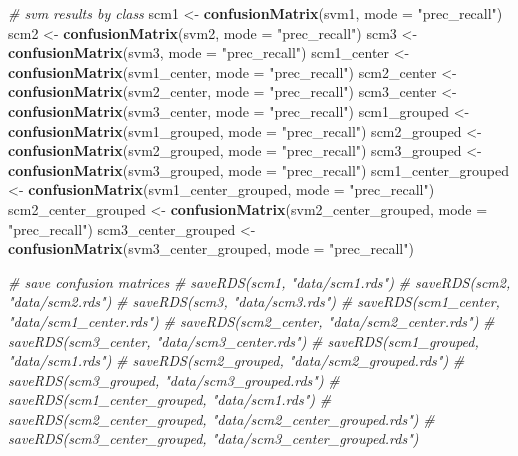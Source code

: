 \documentclass[12pt,twoside]{reedthesis}
\newenvironment{Shaded}{\begin{snugshade}}{\end{snugshade}}
\newcommand{\CommentTok}[1]{\textcolor[rgb]{0.56,0.35,0.01}{\textit{#1}}}
\newcommand{\DataTypeTok}[1]{\textcolor[rgb]{0.13,0.29,0.53}{#1}}
\newcommand{\KeywordTok}[1]{\textcolor[rgb]{0.13,0.29,0.53}{\textbf{#1}}}
\newcommand{\NormalTok}[1]{#1}
\newcommand{\StringTok}[1]{\textcolor[rgb]{0.31,0.60,0.02}{#1}}
\begin{document}
\begin{Shaded}
\begin{Highlighting}[]
{{{\CommentTok{# svm results by class}
\NormalTok{scm1 <-}\StringTok{ }\KeywordTok{confusionMatrix}\NormalTok{(svm1,  }\DataTypeTok{mode =} \StringTok{"prec_recall"}\NormalTok{)}
\NormalTok{scm2 <-}\StringTok{ }\KeywordTok{confusionMatrix}\NormalTok{(svm2,  }\DataTypeTok{mode =} \StringTok{"prec_recall"}\NormalTok{)}
\NormalTok{scm3 <-}\StringTok{ }\KeywordTok{confusionMatrix}\NormalTok{(svm3,  }\DataTypeTok{mode =} \StringTok{"prec_recall"}\NormalTok{)}
\NormalTok{scm1_center <-}\StringTok{ }\KeywordTok{confusionMatrix}\NormalTok{(svm1_center,  }\DataTypeTok{mode =} \StringTok{"prec_recall"}\NormalTok{)}
\NormalTok{scm2_center <-}\StringTok{ }\KeywordTok{confusionMatrix}\NormalTok{(svm2_center,  }\DataTypeTok{mode =} \StringTok{"prec_recall"}\NormalTok{)}
\NormalTok{scm3_center <-}\StringTok{ }\KeywordTok{confusionMatrix}\NormalTok{(svm3_center,  }\DataTypeTok{mode =} \StringTok{"prec_recall"}\NormalTok{)}
\NormalTok{scm1_grouped <-}\StringTok{ }\KeywordTok{confusionMatrix}\NormalTok{(svm1_grouped,  }\DataTypeTok{mode =} \StringTok{"prec_recall"}\NormalTok{)}
\NormalTok{scm2_grouped <-}\StringTok{ }\KeywordTok{confusionMatrix}\NormalTok{(svm2_grouped,  }\DataTypeTok{mode =} \StringTok{"prec_recall"}\NormalTok{)}
\NormalTok{scm3_grouped <-}\StringTok{ }\KeywordTok{confusionMatrix}\NormalTok{(svm3_grouped,  }\DataTypeTok{mode =} \StringTok{"prec_recall"}\NormalTok{)}
\NormalTok{scm1_center_grouped <-}\StringTok{ }\KeywordTok{confusionMatrix}\NormalTok{(svm1_center_grouped,  }
                                       \DataTypeTok{mode =} \StringTok{"prec_recall"}\NormalTok{)}
\NormalTok{scm2_center_grouped <-}\StringTok{ }\KeywordTok{confusionMatrix}\NormalTok{(svm2_center_grouped,  }
                                       \DataTypeTok{mode =} \StringTok{"prec_recall"}\NormalTok{)}
\NormalTok{scm3_center_grouped <-}\StringTok{ }\KeywordTok{confusionMatrix}\NormalTok{(svm3_center_grouped,  }
                                       \DataTypeTok{mode =} \StringTok{"prec_recall"}\NormalTok{)}

\CommentTok{# save confusion matrices}
\CommentTok{# saveRDS(scm1, "data/scm1.rds")}
\CommentTok{# saveRDS(scm2, "data/scm2.rds")}
\CommentTok{# saveRDS(scm3, "data/scm3.rds")}
\CommentTok{# saveRDS(scm1_center, "data/scm1_center.rds")}
\CommentTok{# saveRDS(scm2_center, "data/scm2_center.rds")}
\CommentTok{# saveRDS(scm3_center, "data/scm3_center.rds")}
\CommentTok{# saveRDS(scm1_grouped, "data/scm1.rds")}
\CommentTok{# saveRDS(scm2_grouped, "data/scm2_grouped.rds")}
\CommentTok{# saveRDS(scm3_grouped, "data/scm3_grouped.rds")}
\CommentTok{# saveRDS(scm1_center_grouped, "data/scm1.rds")}
\CommentTok{# saveRDS(scm2_center_grouped, "data/scm2_center_grouped.rds")}
\CommentTok{# saveRDS(scm3_center_grouped, "data/scm3_center_grouped.rds")}

}}}
\end{Highlighting}
\end{Shaded}
\end{document}
